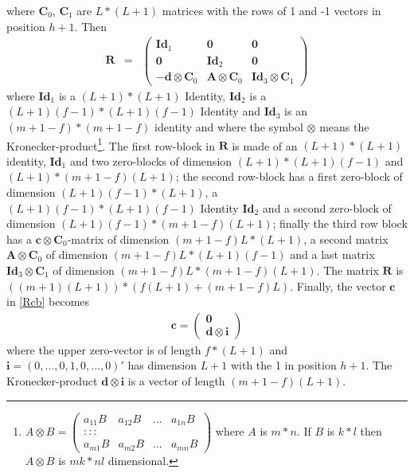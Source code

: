\documentclass[11pt]{article}
\begin{document}
where $\mathbf{C}_0$, $\mathbf{C}_1$ are $L*(L+1)$ matrices with the rows of 1 and -1 vectors in position $h+1$. Then 
\begin{eqnarray}\label{R_rankf}
\mathbf{R}&=&\left(\begin{array}{ccc}\mathbf{Id}_1&\mathbf{0}&\mathbf{0}\\
\mathbf{0}&\mathbf{Id}_2&\mathbf{0}\\
-\mathbf{d}\otimes\mathbf{C}_0&\mathbf{A}\otimes\mathbf{C}_0&\mathbf{Id}_3\otimes\mathbf{C}_1\end{array}\right)
\end{eqnarray}
where $\mathbf{Id}_1$ is a $(L+1)*(L+1)$ Identity, $\mathbf{Id}_2$ is a $(L+1)(f-1)*(L+1)(f-1)$ Identity and $\mathbf{Id}_3$ is an $(m+1-f)*(m+1-f)$ identity and where the symbol $\otimes$ means the Kronecker-product\footnote{$A\otimes B=\left(\begin{array}{cccc}a_{11}B&a_{12}B&...&a_{1n}B\\:::\\a_{m1}B&a_{m2}B&...&a_{mn}B\end{array}\right)$ where $A$ is $m*n$.  If $B$ is $k*l$ then $A\otimes B$ is $mk*nl$ dimensional.}. The first row-block in $\mathbf{R}$ is made of an $(L+1)*(L+1)$ identity, $\mathbf{Id}_1$ and two zero-blocks of dimension $(L+1)*(L+1)(f-1)$ and $(L+1)*(m+1-f)(L+1)$; the second row-block has a first zero-block of dimension $(L+1)(f-1)*(L+1)$, a  $(L+1)(f-1)*(L+1)(f-1)$ Identity $\mathbf{Id}_2$ and a second zero-block of dimension $(L+1)(f-1)*(m+1-f)(L+1)$; finally the third row block has a $\mathbf{c}\otimes\mathbf{C}_0$-matrix of dimension $(m+1-f)L*(L+1)$, a second matrix $\mathbf{A}\otimes\mathbf{C}_0$ of dimension $(m+1-f)L*(L+1)(f-1)$ and a last matrix $\mathbf{Id}_3\otimes\mathbf{C}_1$ of dimension $(m+1-f)L*(m+1-f)(L+1)$. The matrix $\mathbf{R}$ is $((m+1) (L+1))*(f(L+1)+(m+1-f)L)$. Finally, the vector $\mathbf{c}$ in \ref{Rcb} becomes
\begin{eqnarray}\label{c_rankf}
\mathbf{c}=\left(\begin{array}{c}\mathbf{0}\\\mathbf{d}\otimes\mathbf{i}\end{array}\right)
\end{eqnarray}
where the upper zero-vector is of length $f*(L+1)$ and $\mathbf{i}=(0,...,0,1,0,...,0)'$ has dimension $L+1$ with the 1 in position $h+1$. The Kronecker-product $\mathbf{d}\otimes\mathbf{i}$ is a vector of length $(m+1-f)(L+1)$. \\
\end{document}
